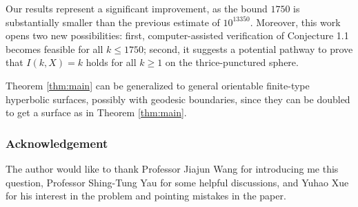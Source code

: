 \documentclass[11pt, a4paper]{article}
\newtheorem{thm}{Theorem}[section]
\newtheorem{cor}[thm]{Corollary}
\theoremstyle{definition}
\theoremstyle{remark}
\newcommand{\abs}[1]{\left| #1 \right|}
\begin{document}
Our results represent a significant improvement, as the bound $1750$ is substantially smaller than the previous estimate of $10^{13350}$. Moreover, this work opens two new possibilities: first, computer-assisted verification of Conjecture 1.1 becomes feasible for all $k \leq 1750$; second, it suggests a potential pathway to prove that $I(k,X) = k$ holds for all $k \geq 1$ on the thrice-punctured sphere.

Theorem \ref{thm:main} can be generalized to general orientable finite-type hyperbolic surfaces, possibly with geodesic boundaries, since they can be doubled to get a surface as in Theorem \ref{thm:main}.


\subsubsection*{Acknowledgement}

The author would like to thank Professor Jiajun Wang for introducing me this question, Professor Shing-Tung Yau for some helpful discussions, and Yuhao Xue for his interest in the problem and pointing mistakes in the paper.

\end{document}
